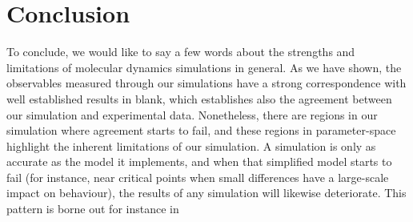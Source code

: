 \section{Conclusion}

To conclude, we would like to say a few words about the strengths and
limitations of molecular dynamics simulations in general. As we have shown, the
observables measured through our simulations have a strong correspondence with
well established results in blank, which establishes also the
agreement between our simulation and experimental data. Nonetheless, there are
regions in our simulation where agreement starts to fail, and these regions in
parameter-space highlight the inherent limitations of our simulation. A
simulation is only as accurate as the model it implements, and when that
simplified model starts to fail (for instance, near critical points when small
differences have a large-scale impact on behaviour), the results of any
simulation will likewise deteriorate. This pattern is borne out for instance in


